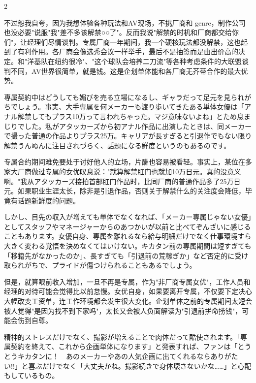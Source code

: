 \documentclass[12pt,UTF8]{ctexbook}
\begin{document}
\begin{paracol}{2}
\switchcolumn

不过恕我自夸，因为我想体验各种玩法和AV现场，不挑厂商和 genre，制作公司也没必要"说服"我"差不多该解禁○○了"。反而我说"解禁的时机和厂商都交给你们"，让经理们尽情谈判。专属厂商一年期间，我一个硬核玩法都没解禁，这也起到了有利作用。各厂商会像选秀会议一样举手，最后不是抽签而是由出价高的决定。和"洋基队在纽约很冷"、"这个球队会培养二刀流"等各种考虑条件的大联盟谈判不同，AV世界很简单，就是钱。这是企划单体能和各厂商无芥蒂合作的最大优势。

\switchcolumn*

専属契約中はどうしても媚びを売る立場になるし、ギャラだって足元を見られがちでしょう。事実、大手専属を何メーカーも渡り歩いてきたある単体女優は「アナル解禁してもプラス10万って言われちゃった。マジ意味ないよね」とため息まじりでした。私がアタッカーズから初アナル作品に出演したときは、同メーカーで撮った普通の作品よりプラス25万。キャリアが長すぎると引退作でもない限り解禁うんぬんに注目されづらく、話題になる鮮度というのもあるのです。

\switchcolumn

专属合约期间难免要处于讨好他人的立场，片酬也容易被看轻。事实上，某位在多家大厂商做过专属的女优叹息说："就算解禁肛门也就加10万日元。真的没意义啊。"我从アタッカーズ接拍首部肛门作品时，比同厂商的普通作品多了25万日元。如果职业生涯太长，除非是引退作品，否则关于解禁什么的关注度会降低，毕竟有话题新鲜度的问题。

\switchcolumn*

しかし、目先の収入が増えても単体でなくなれば、「メーカー専属じゃない女優」としてスタッフやマネージャーからのあつかいが以前と比べてぞんざいに感じることもあります。女優自身、専属を離れるなら給与明細だけでなく仕事環境すら大きく変わる覚悟を決めなくてはいけない。キカタン前の専属期間は短すぎても「移籍先がなかったのか」、長すぎても「引退前の荒稼ぎか」など否定的に受け取られがちで、プライドが傷つけられることもあるでしょう。

\switchcolumn

但是，就算眼前收入增加，一旦不再是专属，作为"非厂商专属女优"，工作人员和经理的对待可能会觉得比以前怠慢。女优自身，如果要离开专属，不仅要下定决心大幅改变工资单，连工作环境都会发生很大变化。企划单体之前的专属期间太短会被人觉得"是因为找不到下家吗"，太长又会被人负面解读为"引退前拼命捞钱"，可能会伤到自尊。

\switchcolumn*

精神的ストレスだけでなく、撮影が増えることで肉体だって酷使されます。「専属契約を終えて、これから企画単体になります」と発表すれば、ファンは「とうとうキカタンに！　あのメーカーやあの人気企画に出てくれるならありがたい!!」と喜ぶだけでなく「大丈夫かね。撮影続きで身体壊さないかな……」と心配もしているもの。


\end{paracol}
\end{document}
